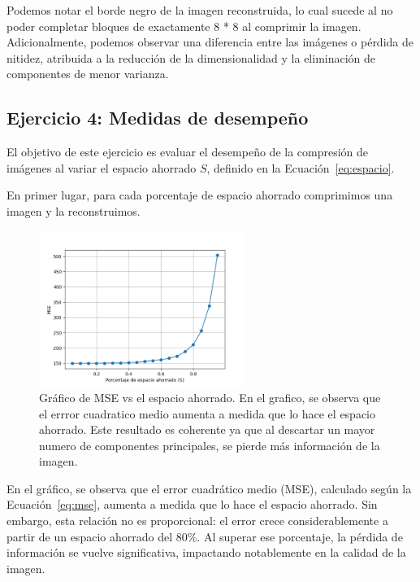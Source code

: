 \documentclass[a4paper,12pt]{article}
\begin{document}
Podemos notar el borde negro de la imagen reconstruida, lo cual sucede al no poder completar bloques de exactamente 8 * 8 al comprimir la imagen.
Adicionalmente, podemos observar una diferencia entre las imágenes o pérdida de nitidez, atribuida a la reducción de la dimensionalidad y la eliminación de componentes de menor varianza.

\vspace{0.5em}

\subsection*{Ejercicio 4: Medidas de desempeño}

El objetivo de este ejercicio es evaluar el desempeño de la compresión de imágenes al variar el espacio ahorrado $S$, definido en la Ecuación~\ref{eq:espacio}.

En primer lugar, para cada porcentaje de espacio ahorrado comprimimos una imagen y la reconstruimos.

\begin{figure}[H]
    \centering
    \includegraphics[width=0.6\textwidth]{Ejercicio 4a.png}
    \caption{Gráfico de MSE vs el espacio ahorrado. En el grafico, se observa que el errror cuadratico medio aumenta a 
    medida que lo hace el espacio ahorrado. Este resultado es coherente ya que al descartar un mayor numero de componentes principales, 
    se pierde más información de la imagen.}
    \label{fig:ej4}
\end{figure}

En el gráfico, se observa que el error cuadrático medio (MSE), calculado según la Ecuación~\ref{eq:mse}, aumenta a medida que lo hace el espacio ahorrado.
Sin embargo, esta relación no es proporcional: el error crece considerablemente a partir de un espacio ahorrado del 80\%. Al superar ese porcentaje, la pérdida de información se vuelve significativa, impactando notablemente en la calidad de la imagen. 
\end{document}

